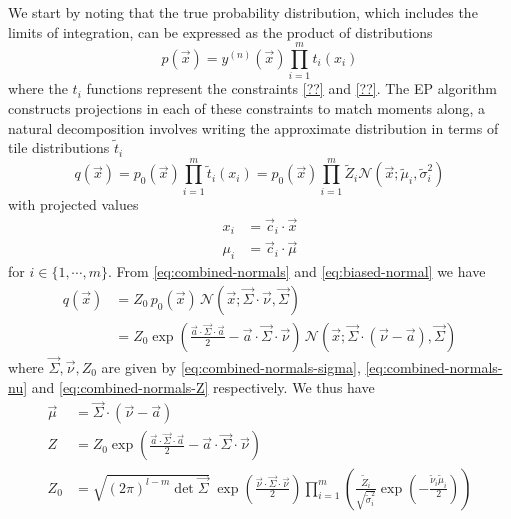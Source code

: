 \documentclass[11pt,twoside]{report}
\begin{document}
We start by noting that the true probability distribution, which includes the limits of integration, can be expressed as the product of distributions
\begin{equation}
  p(\vec{x})
  = y^{(n)}(\vec{x}) \prod_{i=1}^{m} t_i (x_i)
\end{equation}
where the $t_i$ functions represent the constraints \eqref{??} and \eqref{??}.
The EP algorithm constructs projections in each of these constraints to match moments along, a natural decomposition involves writing the approximate distribution in terms of tile distributions $\widetilde{t}_i$
\begin{equation}
  q(\vec{x})
  = p_0(\vec{x}) \prod_{i=1}^{m} \widetilde{t}_i (x_i)
  = p_0(\vec{x}) \prod_{i=1}^{m} \widetilde{Z}_i \mathcal{N}(\vec{x}; \widetilde{\mu}_i, \widetilde{\sigma}_i^2)
\end{equation}
with projected values
\begin{subequations}
  \begin{align}
    x_i &= \vec{c}_i \cdot \vec{x} \\
    \mu_i &= \vec{c}_i \cdot \vec{\mu}
  \end{align}
\end{subequations}
for $i \in \{1,\cdots,m\}$.
From \eqref{eq:combined-normals} and \eqref{eq:biased-normal} we have
\begin{equation}
  \begin{split}
    q(\vec{x}) &=
    Z_0 \,
    p_0(\vec{x}) \,
    \mathcal{N}(\vec{x}; \vec{\Sigma} \cdot \vec{\nu}, \vec{\Sigma}) \\
    &=
    Z_0
    \exp{\left( \frac{\vec{a} \cdot \vec{\Sigma} \cdot \vec{a}}{2} - \vec{a} \cdot \vec{\Sigma} \cdot{\vec{\nu}} \right)} \,
    \mathcal{N}(\vec{x}; \vec{\Sigma} \cdot (\vec{\nu} - \vec{a}), \vec{\Sigma})
  \end{split}
\end{equation}
where $\vec{\Sigma}, \vec{\nu}, Z_0$ are given by \eqref{eq:combined-normals-sigma}, \eqref{eq:combined-normals-nu} and \eqref{eq:combined-normals-Z} respectively.
We thus have
\begin{subequations}
  \begin{align}
    \vec{\mu} &= \vec{\Sigma} \cdot (\vec{\nu} - \vec{a})
    \\
    Z &= Z_0
    \exp{\left( \frac{\vec{a} \cdot \vec{\Sigma} \cdot \vec{a}}{2} - \vec{a} \cdot \vec{\Sigma} \cdot \vec{\nu} \right)}
    \\
    Z_0 &=
    \sqrt{ (2\pi)^{l-m} \det{\vec{\Sigma}} }
    \;
    \exp{\left( \frac{\vec{\nu} \cdot \vec{\Sigma} \cdot \vec{\nu}}{2} \right)}
    \prod_{i=1}^m
    \left(
    \frac{\widetilde{Z}_i}{\sqrt{ \widetilde{\sigma}_i^2 }}
    \exp{\left(-\frac{\widetilde{\nu}_i \widetilde{\mu}_i}{2}\right)}
    \right)
  \end{align}
\end{subequations}
\end{document}
